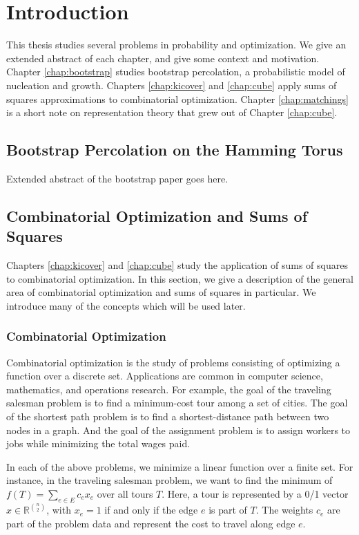 

\chapter{Introduction}
\label{chap:introduction}

This thesis studies several problems in probability and optimization.
We give an extended abstract of each chapter, and give some context and motivation.
Chapter \ref{chap:bootstrap} studies bootstrap percolation, a probabilistic model of nucleation and growth.
Chapters \ref{chap:kicover} and \ref{chap:cube} apply sums of squares approximations to combinatorial optimization.
Chapter \ref{chap:matchings} is a short note on representation theory that grew out of Chapter \ref{chap:cube}.

\section{Bootstrap Percolation on the Hamming Torus}
Extended abstract of the bootstrap paper goes here.

\section{Combinatorial Optimization and Sums of Squares}
Chapters \ref{chap:kicover} and \ref{chap:cube} study the application of sums of squares to combinatorial optimization. 
In this section, we give a description of the general area of combinatorial optimization and sums of squares in particular.
We introduce many of the concepts which will be used later.

\subsection{Combinatorial Optimization}
\label{section:copt}
Combinatorial optimization is the study of problems consisting of optimizing a function over a discrete set. 
Applications are common in computer science, mathematics, and operations research.
For example, the goal of the traveling salesman problem is to find a minimum-cost tour among a set of cities.
The goal of the shortest path problem is to find a shortest-distance path between two nodes in a graph.
And the goal of the assignment problem is to assign workers to jobs while minimizing the total wages paid. 

In each of the above problems, we minimize a linear function over a finite set.
For instance, in the traveling salesman problem, we want to find the minimum of $f(T) = \sum_{e \in E} c_ex_e$ over all tours $T$.
Here, a tour is represented by a 0/1 vector $x \in \mathbb{R}^{n \choose 2}$, with $x_e = 1$ if and only if the edge $e$ is part of $T$.
The weights $c_e$ are part of the problem data and represent the cost to travel along edge $e$.

